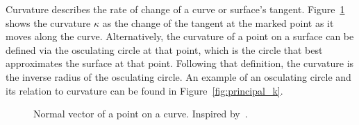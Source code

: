 Curvature describes the rate of change of a curve or surface's tangent.
Figure~\ref{fig:tangent_on_curve} shows the curvature $\kappa$ as the change of the tangent at the marked point as it moves along the curve.
Alternatively, the curvature of a point on a surface can be defined via the osculating circle at that point, which is the circle that best approximates the surface at that point.
Following that definition, the curvature is the inverse radius of the osculating circle.
An example of an osculating circle and its relation to curvature can be found in Figure~\ref{fig:principal_k}.

\begin{figure}[ht]
	\centering
{}
	\caption{%
Normal vector of a point on a curve.
Inspired by~\cite{DDGAppIntro_12_smooth_curves}.}
	\label{fig:tangent_on_curve}
\end{figure}

